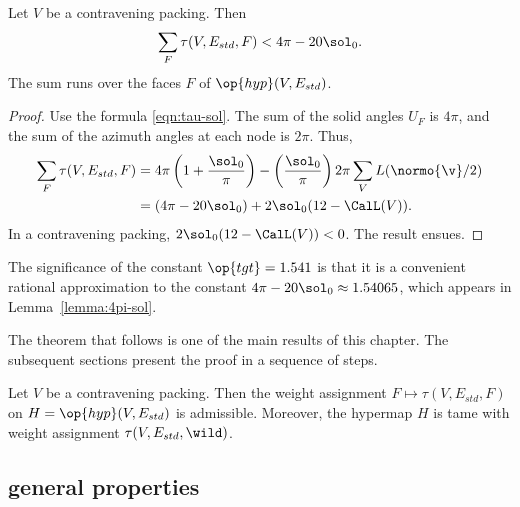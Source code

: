 \begin{lemma}[target]\label{lemma:4pi-sol}
Let $V$ be a contravening packing. %
Then
\[ 
\sum_F \tau (V,E_{std},F) < 4\pi - 20\sol_0.
\] 
The sum runs over the faces $F$ of $\op{hyp}(V,E_{std})$.
\end{lemma}

\begin{proof}
Use the formula \eqref{eqn:tau-sol}.
  The sum of the solid angles $U_F$ is $4\pi$, and the sum of the azimuth
  angles at each node is $2\pi$.
Thus,
\begin{align}\label{eqn:delta0}
  \sum_F \tau (V,E_{std},F) 
  &= 4\pi \left(1 + \dfrac{\sol_0}{\pi}\right) 
- \left(\dfrac{\sol_0}{\pi}\right) 2\pi \sum_{V} L(\normo{\v}/2)\vspace{6pt}\\
&= (4\pi - 20\sol_0) + 2\sol_0 (12 - \CalL(V)).
\end{align}
In a contravening packing, $2\sol_0(12-\CalL(V))<0$.
The result ensues.
\end{proof}

\begin{remark}\label{rem:tgt}
The significance of the constant $\op{tgt}=1.541$ is that it is a
convenient rational approximation to the constant $4\pi -
20\sol_0\approx 1.54065$, which appears in Lemma~\ref{lemma:4pi-sol}.
%
\end{remark}

The theorem that follows is one of the main results of this chapter.  The subsequent
sections present the proof in a sequence of steps.

\begin{theorem} \label{theorem:contravene}
  Let $V$ be a contravening packing.  Then the weight assignment
  $F\mapsto\tau(V,E_{std},F)$ on $H=\op{hyp}(V,E_{std})$ is
  admissible.  Moreover, the hypermap $H$ is tame with weight
  assignment $\tau(V,E_{std},\wild)$.
\end{theorem}
%
%
%


\subsection{general properties}
\label{sec:startame}


